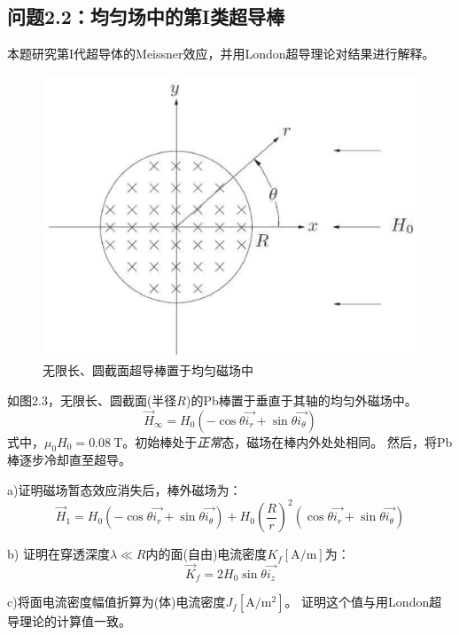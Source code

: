 \subsection{问题2.2：均匀场中的第I类超导棒}
本题研究第I代超导体的Meissner效应，并用London超导理论对结果进行解释。

\begin{figure}[htbp]
	\centering
	\includegraphics[scale=0.4]{chpt2/figs/fig2.3.eps}
	\caption{无限长、圆截面超导棒置于均匀磁场中}
\end{figure}

如图2.3，无限长、圆截面(半径$R$)的Pb棒置于垂直于其轴的均匀外磁场中。
\begin{equation*}\label{eqn:2.40}
  \vec{H}_\infty = H_0 (-\cos \theta\vec{i_r}+\sin\theta\vec{i_\theta}) \tag{2.40}
\end{equation*}
式中，$\mu_0 H_0=0.08\ \mathrm{T}$。初始棒处于\textit{正常}态，磁场在棒内外处处相同。
然后，将Pb棒逐步冷却直至超导。

a)证明磁场暂态效应消失后，棒外磁场为：
\begin{equation}
  \vec{H}_1=H_0(-\cos\theta\vec{i_r}+\sin\theta\vec{i_\theta})+H_0\left(\frac{R}{r}\right)^2 (\cos\theta\vec{i_r}+\sin\theta\vec{i_\theta})
\end{equation}

b) 证明在穿透深度$\lambda\ll R$内的面(自由)电流密度$K_f [\mathrm{A/m}]$为：
\begin{equation}
  \vec{K}_f=2H_0 \sin\theta\vec{i_z}
\end{equation}

c)将面电流密度幅值折算为(体)电流密度$J_f [\mathrm{A/m^2}]$。
证明这个值与用London超导理论的计算值一致。

